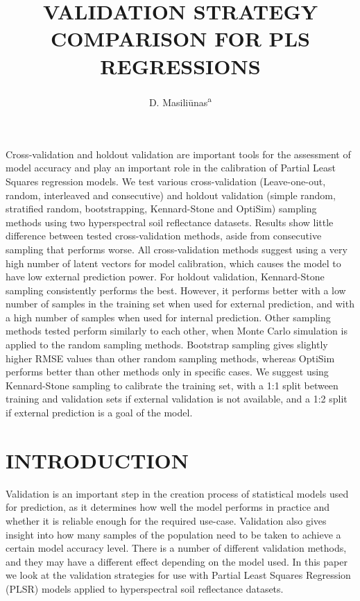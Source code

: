 \documentclass{isprs}
\begin{document}
\title{VALIDATION STRATEGY COMPARISON FOR PLS REGRESSIONS}

\author{
 D. Masili\=unas\textsuperscript{a}}

\address
{
	\textsuperscript{a }Wageningen University, Droevendaalsesteeg 3, NL 6708 PB, Wageningen, The Netherlands - dainius.masiliunas@wur.nl
}

\icwg{}   %

\abstract
{
Cross-validation and holdout validation are important tools for the assessment of model accuracy and play an important role in the calibration of Partial Least Squares regression models. We test various cross-validation (Leave-one-out, random, interleaved and consecutive) and holdout validation (simple random, stratified random, bootstrapping, Kennard-Stone and OptiSim) sampling methods using two hyperspectral soil reflectance datasets. Results show little difference between tested cross-validation methods, aside from consecutive sampling that performs worse. All cross-validation methods suggest using a very high number of latent vectors for model calibration, which causes the model to have low external prediction power. For holdout validation, Kennard-Stone sampling consistently performs the best. However, it performs better with a low number of samples in the training set when used for external prediction, and with a high number of samples when used for internal prediction. Other sampling methods tested perform similarly to each other, when Monte Carlo simulation is applied to the random sampling methods. Bootstrap sampling gives slightly higher RMSE values than other random sampling methods, whereas OptiSim performs better than other methods only in specific cases. We suggest using Kennard-Stone sampling to calibrate the training set, with a 1:1 split between training and validation sets if external validation is not available, and a 1:2 split if external prediction is a goal of the model.
}


\maketitle

\section{INTRODUCTION}\label{INTRODUCTION}

Validation is an important step in the creation process of statistical models used for prediction, as it determines how well the model performs in practice and whether it is reliable enough for the required use-case. Validation also gives insight into how many samples of the population need to be taken to achieve a certain model accuracy level. There is a number of different validation methods, and they may have a different effect depending on the model used. In this paper we look at the validation strategies for use with Partial Least Squares Regression (PLSR) models applied to hyperspectral soil reflectance datasets.
\end{document}

